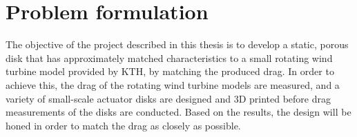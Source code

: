 \section{Problem formulation}
The objective of the project described in this thesis is to develop a static, porous disk that has approximately matched characteristics to a small rotating wind turbine model provided by KTH, by matching the produced drag. In order to achieve this, the drag of the rotating wind turbine models are measured, and a variety of small-scale actuator disks are designed and 3D printed before drag measurements of the disks are conducted. Based on the results, the design will be honed in order to match the drag as closely as possible. 

